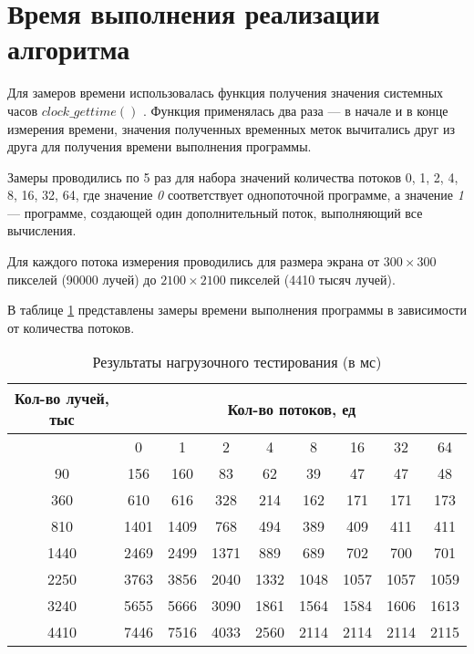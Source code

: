 \section{Время выполнения реализации алгоритма}

Для замеров времени использовалась функция получения значения системных часов $clock\_gettime()$ \cite{gettime}. Функция применялась два раза --- в начале и в конце измерения времени, значения полученных временных меток вычитались друг из друга для получения времени выполнения программы.


Замеры проводились по 5 раз для набора значений количества потоков {0, 1, 2, 4, 8, 16, 32, 64}, где значение \textit{0} соответствует однопоточной программе, а значение \textit{1} --- программе, создающей один дополнительный поток, выполняющий все вычисления.

Для каждого потока измерения проводились для размера экрана от $300\times300$ пикселей (90000 лучей) до $2100\times2100$ пикселей (4410 тысяч лучей).

В таблице \ref{tbl:threads} представлены замеры времени выполнения программы в зависимости от количества потоков.


\begin{table}[h]
	\begin{center}
		\begin{threeparttable}
			\caption{Результаты нагрузочного тестирования (в мс)}
			\label{tbl:threads}
			\begin{tabular}{|c|c|c|c|c|c|c|c|c|}
				\hline
				{Кол-во лучей, тыс} & \multicolumn{8}{c}{Кол-во потоков, ед} \\
				\hline
				& 0 & 1 & 2 & 4 & 8 & 16 & 32 & 64 \\
				\hline
				90 & 156 & 160 & 83 & 62 & 39 & 47 & 47 & 48 \\
				\hline
				360 & 610 & 616 & 328 & 214 & 162 & 171 & 171 & 173 \\
				\hline
				810 & 1401 & 1409 & 768 & 494 & 389 & 409 & 411 & 411 \\
				\hline
				1440 & 2469 & 2499 & 1371 & 889 & 689 & 702 & 700 & 701 \\
				\hline
				2250 & 3763 & 3856 & 2040 & 1332 & 1048 & 1057 & 1057 & 1059 \\
				\hline
				3240 & 5655 & 5666 & 3090 & 1861 & 1564 & 1584 & 1606 & 1613 \\
				\hline
				4410 & 7446 & 7516 & 4033 & 2560 & 2114 & 2114 & 2114 & 2115 \\
				\hline
				
			\end{tabular}
		\end{threeparttable}
	\end{center}
\end{table}

